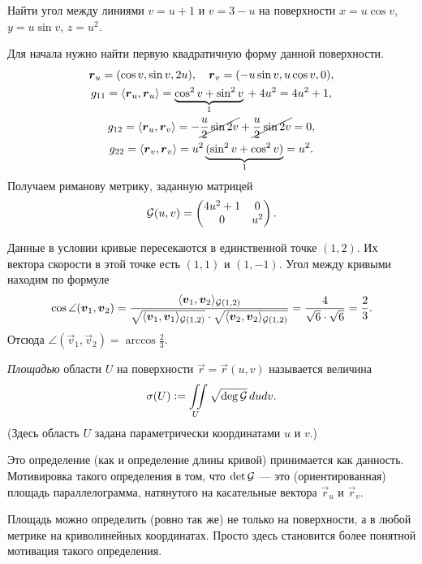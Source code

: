 \begin{problem}
	Найти угол между линиями $v = u + 1$ и $v = 3 - u$ на поверхности $x = u\cos v$, $y = u\sin v$, $z = u^2$.
\end{problem}

\begin{solution}
	Для начала нужно найти первую квадратичную форму данной поверхности.
	\begin{gather*}
		\vec{r}_u = (\cos v, \sin v, 2u),\quad \vec{r}_v = (-u\sin v, u\cos v, 0),\\
		g_{11} = \langle\vec{r}_u, \vec{r}_u\rangle = \underbrace{\cos^2v + \sin^2v}_{1} {} + 4u^2 = 4u^2 + 1,\\
		g_{12} = \langle\vec{r}_u, \vec{r}_v\rangle = -\cancel{\frac{u}{2}\sin2v} + \cancel{\frac{u}{2}\sin2v} = 0,\\
		g_{22} = \langle\vec{r}_v, \vec{r}_v\rangle = u^2\underbrace{(\sin^2v + \cos^2v)}_{1} = u^2.
	\end{gather*}
	Получаем риманову метрику, заданную матрицей
	\[
		\G(u, v) =
		\begin{pmatrix}
			4u^2 + 1 & 0\\
			0 & u^2
		\end{pmatrix}.
	\]

	Данные в условии кривые пересекаются в единственной точке $(1, 2)$. Их вектора скорости в этой точке есть $(1, 1)$ и $(1, -1)$. Угол между кривыми находим по формуле
	\[
		\cos\angle(\vec{v}_1, \vec{v}_2) = \frac{\langle\vec{v}_1, \vec{v}_2\rangle_{\G(1, 2)}}{\sqrt{\langle\vec{v}_1, \vec{v}_1\rangle_{\G(1, 2)}} \cdot \sqrt{\langle\vec{v}_2, \vec{v}_2\rangle_{\G(1, 2)}}} = \frac{4}{\sqrt{6} \cdot \sqrt{6}} = \frac{2}{3}.
	\]
	Отсюда $\angle(\vec{v}_1, \vec{v}_2) = \arccos\frac{2}{3}$.
\end{solution}

\begin{definition}
	\textit{Площадью} области $U$ на поверхности $\vec{r} = \vec{r}(u, v)$ называется величина
	\[
		\sigma(U) \vcentcolon = \iint\limits_{U}\sqrt{\deg\G}\,dudv.
	\]
	(Здесь область $U$ задана параметрически координатами $u$ и $v$.)
\end{definition}

Это определение (как и определение длины кривой) принимается как данность. Мотивировка такого определения в том, что $\det\G$ --- это (ориентированная) площадь параллелограмма, натянутого на касательные вектора $\vec{r}_u$ и $\vec{r}_v$.

Площадь можно определить (ровно так же) не только на поверхности, а в любой метрике на криволинейных координатах. Просто здесь становится более понятной мотивация такого определения.

